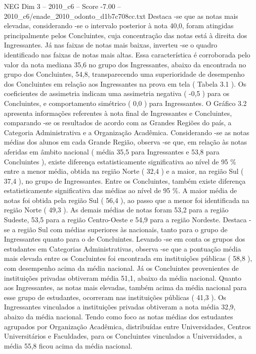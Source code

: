 \begin{textsample}{NEG Dim 3 – 2010\_c6 – Score -7.00 – 2010\_c6/enade\_2010\_odonto\_d1b7c708cc.txt}
Destaca -se que as notas mais elevadas, considerando -se o intervalo posterior à nota 40,0, foram atingidas principalmente pelos Concluintes, cuja concentração das notas está à direita dos Ingressantes.
Já nas faixas de notas mais baixas, inverteu -se o quadro identificado nas faixas de notas mais altas.
Essa característica é corroborada pelo valor da nota mediana 35,6 no grupo dos Ingressantes, abaixo da encontrada no grupo dos Concluintes, 54,8, transparecendo uma superioridade de desempenho dos Concluintes em relação aos Ingressantes na prova em tela ( Tabela 3.1 ).
Os coeficientes de assimetria indicam uma assimetria negativa ( -0,5 ) para os Concluintes, e comportamento simétrico ( 0,0 ) para Ingressantes.
O Gráfico 3.2 apresenta informações referentes à nota final de Ingressantes e Concluintes, comparando -se os resultados de acordo com as Grandes Regiões do país, a Categoria Administrativa e a Organização Acadêmica.
Considerando -se as notas médias dos alunos em cada Grande Região, observa -se que, em relação às notas aferidas em âmbito nacional ( média 35,5 para Ingressantes e 53,8 para Concluintes ), existe diferença estatisticamente significativa ao nível de 95 \% entre a menor média, obtida na região Norte ( 32,4 ) e a maior, na região Sul ( 37,4 ), no grupo de Ingressantes.
Entre os Concluintes, também existe diferença estatisticamente significativa das médias ao nível de 95 \%.
A maior média de notas foi obtida pela região Sul ( 56,4 ), ao passo que a menor foi identificada na região Norte ( 49,3 ).
As demais médias de notas foram 53,2 para a região Sudeste, 53,5 para a região Centro-Oeste e 54,9 para a região Nordeste.
Destaca -se a região Sul com médias superiores às nacionais, tanto para o grupo de Ingressantes quanto para o de Concluintes.
Levando -se em conta os grupos dos estudantes em Categorias Administrativas, observa -se que a pontuação média mais elevada entre os Concluintes foi encontrada em instituições públicas ( 58,8 ), com desempenho acima da média nacional.
Já os Concluintes provenientes de instituições privadas obtiveram média 51,1, abaixo da média nacional.
Quanto aos Ingressantes, as notas mais elevadas, também acima da média nacional para esse grupo de estudantes, ocorreram nas instituições públicas ( 41,3 ).
Os Ingressantes vinculados a instituições privadas obtiveram a nota média 32,9, abaixo da média nacional.
Tendo como foco as notas médias dos estudantes agrupados por Organização Acadêmica, distribuídas entre Universidades, Centros Universitários e Faculdades, para os Concluintes vinculados a Universidades, a média 55,8 ficou acima da média nacional.

\end{textsample}
